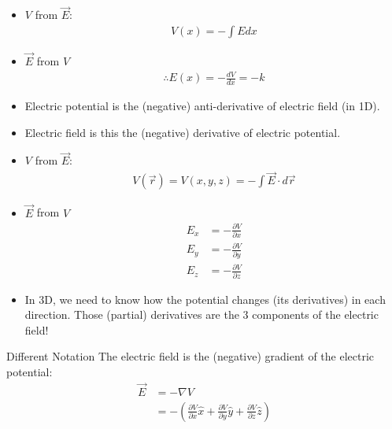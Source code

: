 \documentclass[aspectratio=169,
hyperref={colorlinks,urlcolor=blue}
]{beamer}
\begin{document}
{
\begin{itemize}
\item $V$ from $\vec E$:
\begin{align*}
V(x) = -\int E dx
\end{align*}
\item $\vec E$ from $V$
\begin{align*}
\therefore E(x) = -\frac{dV}{dx}=-k
\end{align*}
\item Electric potential is the (negative) anti-derivative of electric field (in 1D).
\item Electric field  is this the (negative) derivative of electric potential.
\end{itemize}

}
{
\begin{center}
\end{center}
}


{
\vspace{-0.5cm}
\begin{itemize}
\item $V$ from $\vec E$:
\begin{align*}
V(\vec r)= V(x,y,z) = -\int \vec E \cdot  d\vec r
\end{align*}
\item $\vec E$ from $V$
\begin{align*}
E_x &= -\frac{\partial V}{\partial x}\\
E_y &= -\frac{\partial V}{\partial y}\\
E_z &= -\frac{\partial V}{\partial z}
\end{align*}
\item In 3D, we need to know how the potential changes (its derivatives) in each direction. Those (partial) derivatives are the 3 components of the electric field!
\end{itemize}

}
{
\begin{block}{Different Notation}
The electric field is the (negative) gradient of the electric potential:
\begin{align*}
\vec E &= -\nabla V\\
&=-\left( \frac{\partial V}{\partial x} \hat x + \frac{\partial V}{\partial y}\hat y+\frac{\partial V}{\partial z}\hat z\right)
\end{align*}
\end{block}
}
\end{document}
